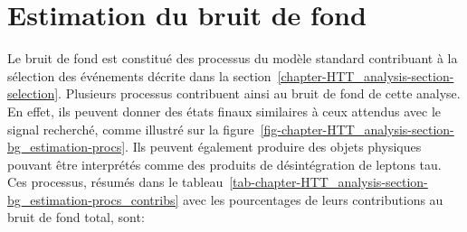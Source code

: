 \section{Estimation du bruit de fond}\label{chapter-HTT_analysis-section-bg_estimation}
Le bruit de fond est constitué des processus du modèle standard contribuant à la sélection des événements décrite dans la section~\ref{chapter-HTT_analysis-section-selection}.
Plusieurs processus contribuent ainsi au bruit de fond de cette analyse.
En effet, ils peuvent donner des états finaux similaires à ceux attendus avec le signal recherché, comme illustré sur la figure~\ref{fig-chapter-HTT_analysis-section-bg_estimation-procs}.
Ils peuvent également produire des objets physiques pouvant être interprétés comme des produits de désintégration de leptons tau.
Ces processus, résumés dans le tableau~\ref{tab-chapter-HTT_analysis-section-bg_estimation-procs_contribs} avec les pourcentages de leurs contributions au bruit de fond total, sont:
